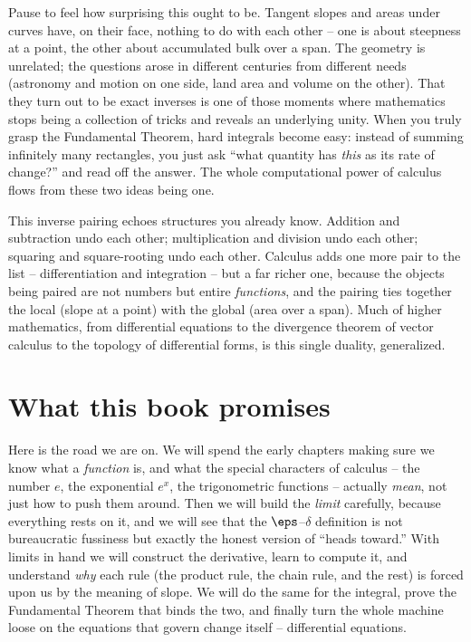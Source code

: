 \begin{aestheticbox}
Pause to feel how surprising this ought to be. Tangent slopes and areas under
curves have, on their face, nothing to do with each other -- one is about
steepness at a point, the other about accumulated bulk over a span. The geometry
is unrelated; the questions arose in different centuries from different needs
(astronomy and motion on one side, land area and volume on the other). That they
turn out to be exact inverses is one of those moments where mathematics stops
being a collection of tricks and reveals an underlying unity. When you truly
grasp the Fundamental Theorem, hard integrals become easy: instead of summing
infinitely many rectangles, you just ask ``what quantity has \emph{this} as its
rate of change?'' and read off the answer. The whole computational power of
calculus flows from these two ideas being one.
\end{aestheticbox}

\begin{connectionbox}
This inverse pairing echoes structures you already know. Addition and
subtraction undo each other; multiplication and division undo each other;
squaring and square-rooting undo each other. Calculus adds one more pair to the
list -- differentiation and integration -- but a far richer one, because the
objects being paired are not numbers but entire \emph{functions}, and the pairing
ties together the local (slope at a point) with the global (area over a span).
Much of higher mathematics, from differential equations to the divergence theorem
of vector calculus to the topology of differential forms, is this single duality,
generalized.
\end{connectionbox}

\section{What this book promises}

Here is the road we are on. We will spend the early chapters making sure we know
what a \emph{function} is, and what the special characters of calculus -- the
number $e$, the exponential $e^x$, the trigonometric functions -- actually
\emph{mean}, not just how to push them around. Then we will build the
\emph{limit} carefully, because everything rests on it, and we will see that the
$\eps$--$\delta$ definition is not bureaucratic fussiness but exactly the honest
version of ``heads toward.'' With limits in hand we will construct the
derivative, learn to compute it, and understand \emph{why} each rule (the
product rule, the chain rule, and the rest) is forced upon us by the meaning of
slope. We will do the same for the integral, prove the Fundamental Theorem that
binds the two, and finally turn the whole machine loose on the equations that
govern change itself -- differential equations.

